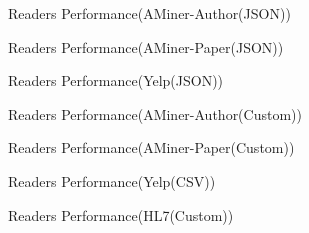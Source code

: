 \documentclass[sigconf,nonacm,screen]{acmart}
\begin{document}


    \begin{figure}[h]
        \centering
        
        \caption{Readers Performance(AMiner-Author(JSON))}
    \end{figure}

    \begin{figure}[h]
        \centering
        
        \caption{Readers Performance(AMiner-Paper(JSON))}
    \end{figure}

    \begin{figure}[h]
        \centering
        
        \caption{Readers Performance(Yelp(JSON))}
    \end{figure}

    \begin{figure}[h]
        \centering
        
        \caption{Readers Performance(AMiner-Author(Custom))}
    \end{figure}

    \begin{figure}[h]
        \centering
        
        \caption{Readers Performance(AMiner-Paper(Custom))}
    \end{figure}

    \begin{figure}[h]
        \centering
        
        \caption{Readers Performance(Yelp(CSV))}
    \end{figure}

    \begin{figure}[h]
        \centering
        
        \caption{Readers Performance(HL7(Custom))}
    \end{figure}
\end{document}

